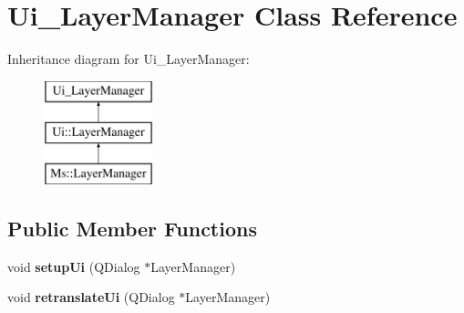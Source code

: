 \hypertarget{class_ui___layer_manager}{}\section{Ui\+\_\+\+Layer\+Manager Class Reference}
\label{class_ui___layer_manager}
Inheritance diagram for Ui\+\_\+\+Layer\+Manager\+:\begin{figure}[H]
\begin{center}
\leavevmode
\includegraphics[height=3.000000cm]{class_ui___layer_manager}
\end{center}
\end{figure}
\subsection*{Public Member Functions}
\begin{DoxyCompactItemize}
\item 
\mbox{\label{class_ui___layer_manager_a4026d3783c949e81f0ef2d3a07c1bf50}} 
void {\bfseries setup\+Ui} (Q\+Dialog $\ast$Layer\+Manager)
\item 
\mbox{\label{class_ui___layer_manager_a0125e176aacb16635f246249fc4ce4dd}} 
void {\bfseries retranslate\+Ui} (Q\+Dialog $\ast$Layer\+Manager)
\end{DoxyCompactItemize}
